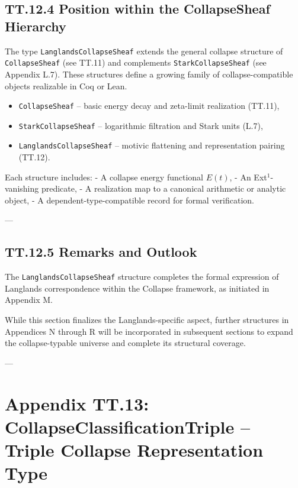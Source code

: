 \documentclass[11pt]{article}
\begin{document}
\subsection*{TT.12.4 Position within the CollapseSheaf Hierarchy}

The type \texttt{LanglandsCollapseSheaf} extends the general collapse structure of \texttt{CollapseSheaf} (see TT.11)  
and complements \texttt{StarkCollapseSheaf} (see Appendix L.7). These structures define a growing family of  
collapse-compatible objects realizable in Coq or Lean.

\begin{itemize}
  \item \texttt{CollapseSheaf} – basic energy decay and zeta-limit realization (TT.11),
  \item \texttt{StarkCollapseSheaf} – logarithmic filtration and Stark units (L.7),
  \item \texttt{LanglandsCollapseSheaf} – motivic flattening and representation pairing (TT.12).
\end{itemize}

Each structure includes:
- A collapse energy functional \( E(t) \),
- An Ext$^1$-vanishing predicate,
- A realization map to a canonical arithmetic or analytic object,
- A dependent-type-compatible record for formal verification.

---

\subsection*{TT.12.5 Remarks and Outlook}

The \texttt{LanglandsCollapseSheaf} structure completes the formal expression  
of Langlands correspondence within the Collapse framework, as initiated in Appendix M.

While this section finalizes the Langlands-specific aspect,  
further structures in Appendices N through R will be incorporated in subsequent sections  
to expand the collapse-typable universe and complete its structural coverage.

---

\section*{Appendix TT.13: CollapseClassificationTriple – Triple Collapse Representation Type}
\end{document}
